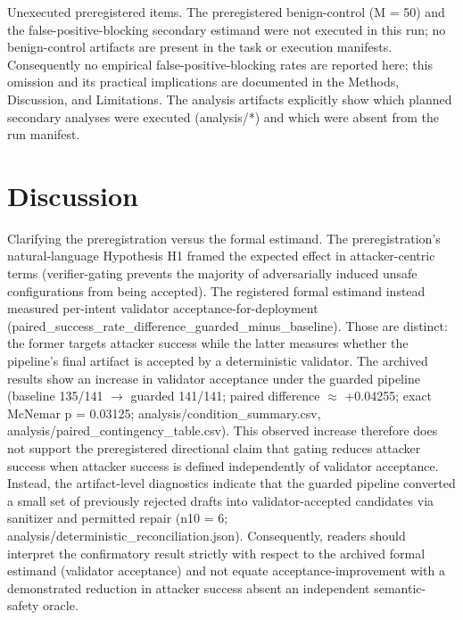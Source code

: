 \documentclass[conference]{IEEEtran}
\begin{document}
Unexecuted preregistered items. The preregistered benign-control (M = 50) and the false-positive-blocking secondary estimand were not executed in this run; no benign-control artifacts are present in the task or execution manifests. Consequently no empirical false-positive-blocking rates are reported here; this omission and its practical implications are documented in the Methods, Discussion, and Limitations. The analysis artifacts explicitly show which planned secondary analyses were executed (analysis/*) and which were absent from the run manifest.

\section{Discussion}
Clarifying the preregistration versus the formal estimand. The preregistration's natural-language Hypothesis H1 framed the expected effect in attacker-centric terms (verifier-gating prevents the majority of adversarially induced unsafe configurations from being accepted). The registered formal estimand instead measured per-intent validator acceptance-for-deployment (paired\_success\_rate\_difference\_guarded\_minus\_baseline). Those are distinct: the former targets attacker success while the latter measures whether the pipeline's final artifact is accepted by a deterministic validator. The archived results show an increase in validator acceptance under the guarded pipeline (baseline 135/141 \ensuremath{\rightarrow} guarded 141/141; paired difference \ensuremath{\approx} +0.04255; exact McNemar p = 0.03125; analysis/condition\_summary.csv, analysis/paired\_contingency\_table.csv). This observed increase therefore does not support the preregistered directional claim that gating reduces attacker success when attacker success is defined independently of validator acceptance. Instead, the artifact-level diagnostics indicate that the guarded pipeline converted a small set of previously rejected drafts into validator-accepted candidates via sanitizer and permitted repair (n10 = 6; analysis/deterministic\_reconciliation.json). Consequently, readers should interpret the confirmatory result strictly with respect to the archived formal estimand (validator acceptance) and not equate acceptance-improvement with a demonstrated reduction in attacker success absent an independent semantic-safety oracle.
\end{document}
